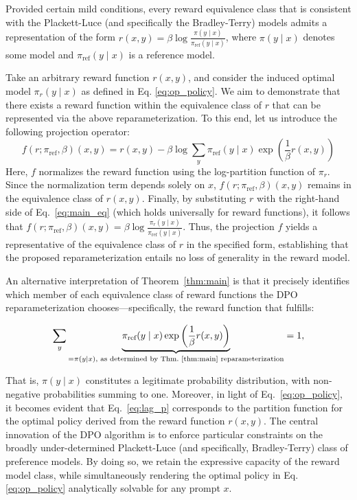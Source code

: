 \begin{theorem}\label{thm:main}
    Provided certain mild conditions, every reward equivalence class that is consistent with the Plackett-Luce (and specifically the Bradley-Terry) models admits a representation of the form ${r(x, y) = \beta \log \frac{\pi(y\mid x)}{\pi_\text{ref}(y\mid x)}}$, where $\pi(y\mid x)$ denotes some model and $\pi_\text{ref}(y \mid x)$ is a reference model.
\end{theorem}

\begin{sproof}
    Take an arbitrary reward function $r(x, y)$, and consider the induced optimal model $\pi_r(y \mid x)$ as defined in Eq. \ref{eq:op_policy}. We aim to demonstrate that there exists a reward function within the equivalence class of $r$ that can be represented via the above reparameterization. To this end, let us introduce the following projection operator:
\begin{equation}
    f(r; \pi_\text{ref}, \beta)(x, y) = r(x, y) - \beta\log\sum_{y}\pi_\text{ref}(y\mid x)\exp\left(\frac{1}{\beta}r(x, y)\right)
\end{equation}
Here, $f$ normalizes the reward function using the log-partition function of $\pi_r$. Since the normalization term depends solely on $x$, $f(r; \pi_\text{ref}, \beta)(x, y)$ remains in the equivalence class of $r(x, y)$. Finally, by substituting $r$ with the right-hand side of Eq.~\ref{eq:main_eq} (which holds universally for reward functions), it follows that $f(r; \pi_\text{ref}, \beta)(x, y) = \beta \log \frac{\pi_r(y\mid x)}{\pi_\text{ref}(y\mid x)}$. Thus, the projection $f$ yields a representative of the equivalence class of $r$ in the specified form, establishing that the proposed reparameterization entails no loss of generality in the reward model.
\end{sproof}

An alternative interpretation of Theorem~\ref{thm:main} is that it precisely identifies which member of each equivalence class of reward functions the DPO reparameterization chooses—specifically, the reward function that fulfills:

\begin{equation}\label{eq:lag_p}
     \sum_{y}\underbrace{\pi_\text{ref}(y\mid x)\exp\left(\frac{1}{\beta}r(x, y)\right)}_{=\pi(y\mid x)\text{, as determined by Thm.~\ref{thm:main} reparameterization}} = 1,
\end{equation}

That is, $\pi(y\mid x)$ constitutes a legitimate probability distribution, with non-negative probabilities summing to one. Moreover, in light of Eq.~\ref{eq:op_policy}, it becomes evident that Eq.~\ref{eq:lag_p} corresponds to the partition function for the optimal policy derived from the reward function $r(x, y)$. The central innovation of the DPO algorithm is to enforce particular constraints on the broadly under-determined Plackett-Luce (and specifically, Bradley-Terry) class of preference models. By doing so, we retain the expressive capacity of the reward model class, while simultaneously rendering the optimal policy in Eq. \ref{eq:op_policy} analytically solvable for any prompt $x$.

